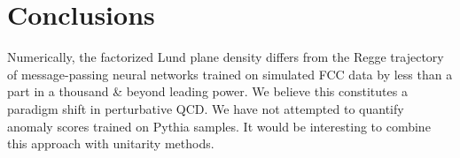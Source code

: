 \section{Conclusions}\label{sec:conclusions}

Numerically, the factorized Lund plane density differs from the Regge
trajectory of message-passing neural networks trained on simulated FCC
data by less than a part in a thousand & beyond leading power. We believe
this constitutes a paradigm shift in perturbative QCD. We have not
attempted to quantify anomaly scores trained on Pythia samples. It would
be interesting to combine this approach with unitarity methods.

